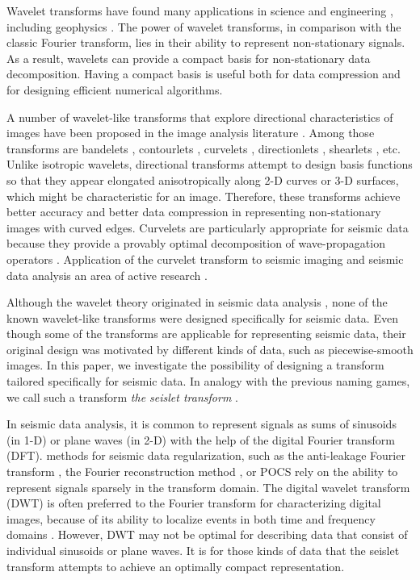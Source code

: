 Wavelet transforms have found many applications in science and engineering 
\cite[]{mallat}, including geophysics \cite[]{SEG-1994-1465,dessing,wapenaar,hesam}. 
The power of wavelet transforms, in comparison with the classic Fourier 
transform, lies in their ability to represent non-stationary signals.  As a 
result, wavelets can provide a compact basis for non-stationary 
data decomposition. Having a compact basis is useful both for data compression 
and for designing efficient numerical algorithms.

A number of wavelet-like transforms that explore directional characteristics 
of images have been proposed in the image analysis literature \cite[]{beyond}. Among 
those transforms are bandelets \cite[]{bandelet}, %
contourlets \cite[]{contourlet}, curvelets \cite[]{curvelet}, directionlets 
\cite[]{directionlet}, shearlets \cite[]{shearlet}, etc. Unlike isotropic 
wavelets, di\-rec\-ti\-onal transforms attempt to design basis
functions so that they appear elongated anisotropically along 2-D
curves or 3-D surfaces, which might be characteristic for an
image. Therefore, these transforms achieve better accuracy and better
data compression in representing non-stationary images with curved
edges.  Curvelets are particularly appropriate for seismic data
because they provide {a} provably optimal decomposition of
wave-propagation operators \cite[]{candes}.  Application of the
curvelet transform to seismic imaging and seismic data analysis
  an area of active research
\cite[]{herrmann,douma,chauris,herrmann08}.

Although {the} wavelet theory originated in seismic data analysis
\cite[]{SEG-1981-S15.1}, none of the known wavelet-like transforms were 
designed specifically for seismic data. Even though some of the
transforms are applicable for representing seismic data, their
original design was motivated by different kinds of data, such as
piecewise-smooth images. In this paper, we investigate the possibility
{of designing} a transform tailored specifically
for seismic data. In analogy with the previous naming games, we call
such a transform \emph{the seislet transform} \cite[]{seislet}.

In seismic data analysis, it is common to represent signals as sums of
sinusoids (in 1-D) or plane waves (in 2-D) with the help of the
digital Fourier transform (DFT).  
methods for seismic data regularization, such as the anti-leakage
Fourier transform \cite[]{antileak}, the Fourier reconstruction method
\cite[]{frsi1,frsi2,frsi3}, {or POCS \cite[]{pocs}} rely on the ability to represent signals
sparsely in the transform domain. The digital wavelet transform (DWT)
is often preferred to the Fourier transform for characterizing digital
images, because of its ability to localize events in both time and
frequency domains \cite[]{ripples,mallat}.  However, DWT may not be
optimal for describing data that consist of individual sinusoids or
plane waves. It is for {those} kinds of data that the seislet
transform attempts to achieve an optimally compact representation.

